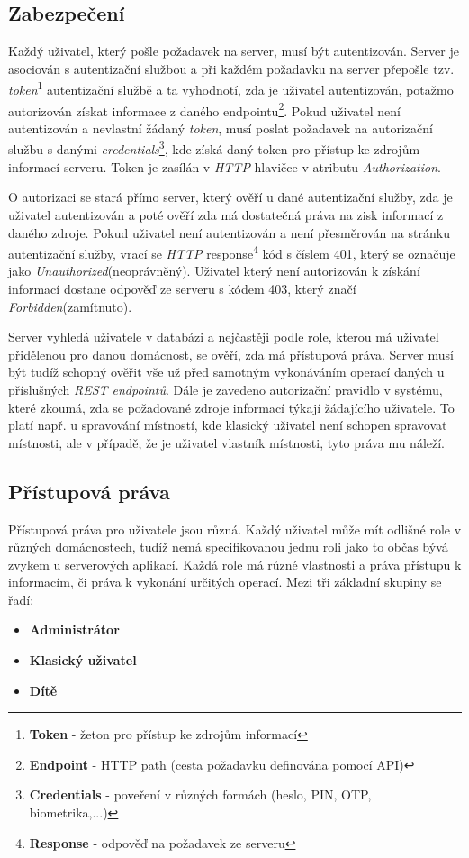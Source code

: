 \subsection*{Zabezpečení}
\label{backend:bezpecnost}
Každý uživatel, který pošle požadavek na server, musí být autentizován.
Server je asociován s autentizační službou a při každém požadavku na server přepošle tzv. \emph{token}\footnote{\textbf{Token} - žeton pro přístup ke zdrojům informací} autentizační službě
a ta vyhodnotí, zda je uživatel autentizován, potažmo autorizován získat informace z daného endpointu\footnote{\textbf{Endpoint} - HTTP path (cesta požadavku definována pomocí API)}.
Pokud uživatel není autentizován a nevlastní žádaný \emph{token}, musí poslat požadavek na autorizační službu s danými \emph{credentials}\footnote{\textbf{Credentials} - poveření v různých formách (heslo, PIN, OTP, biometrika,...)},
kde získá daný token pro přístup ke zdrojům informací serveru. Token je zasílán v \emph{HTTP} hlavičce v atributu \emph{Authorization}.

O autorizaci se stará přímo server, který ověří u dané autentizační služby, zda je uživatel autentizován a poté ověří zda má dostatečná práva na zisk informací z daného zdroje.
Pokud uživatel není autentizován a není přesměrován na stránku autentizační služby, vrací se \emph{HTTP} response\footnote{\textbf{Response} - odpověď na požadavek ze serveru} kód s číslem 401, který se označuje jako \emph{Unauthorized}(neoprávněný).
Uživatel který není autorizován k získání informací dostane odpověď ze serveru s kódem 403, který značí \emph{Forbidden}(zamítnuto).

Server vyhledá uživatele v databázi a nejčastěji podle role, kterou má uživatel přidělenou pro danou domácnost, se ověří, zda má přístupová práva.
Server musí být tudíž schopný ověřit vše už před samotným vykonáváním operací daných u příslušných \emph{REST endpointů}.
Dále je zavedeno autorizační pravidlo v systému, které zkoumá, zda se požadované zdroje informací týkají žádajícího uživatele.
To platí např. u spravování místností, kde klasický uživatel není schopen spravovat místnosti, ale v případě, že je uživatel vlastník místnosti, tyto práva mu náleží.

\subsection*{Přístupová práva}
\label{backend:prava}
Přístupová práva pro uživatele jsou různá. Každý uživatel může mít odlišné role v různých domácnostech, tudíž nemá specifikovanou jednu roli jako to občas bývá zvykem u serverových aplikací.
Každá role má různé vlastnosti a práva přístupu k informacím, či práva k vykonání určitých operací.
\newline
Mezi tři základní skupiny se řadí:
\begin{itemize}
  \item \textbf{Administrátor}
  \item \textbf{Klasický uživatel}
  \item \textbf{Dítě}
\end{itemize}

